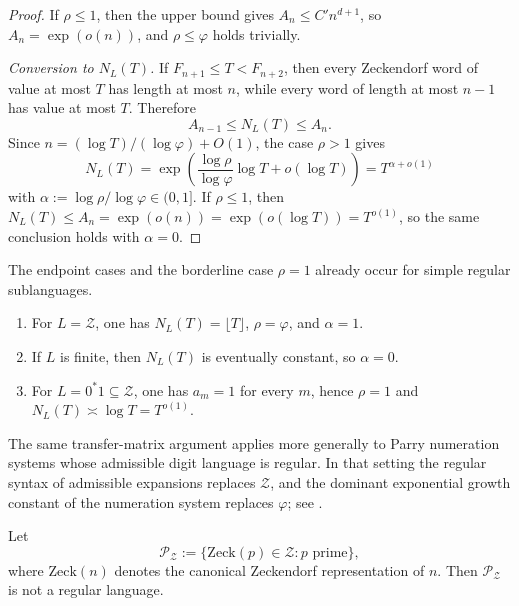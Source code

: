 \begin{proof}
  If \(\rho\le 1\), then the upper bound gives
  \(A_n\le C'n^{d+1}\), so \(A_n=\exp(o(n))\), and \(\rho\le\varphi\)
  holds trivially.

  \textit{Conversion to \(N_L(T)\).}
  If \(F_{n+1}\le T<F_{n+2}\), then every Zeckendorf word of value at
  most \(T\) has length at most \(n\), while every word of length at
  most \(n-1\) has value at most \(T\). Therefore
  \[
    A_{n-1}\le N_L(T)\le A_n.
  \]
  Since \(n=(\log T)/(\log\varphi)+O(1)\), the case \(\rho>1\) gives
  \[
    N_L(T)
    =\exp\!\left(
      \frac{\log\rho}{\log\varphi}\log T+o(\log T)
    \right)
    =T^{\alpha+o(1)}
  \]
  with \(\alpha:=\log\rho/\log\varphi\in(0,1]\). If \(\rho\le 1\),
  then \(N_L(T)\le A_n=\exp(o(n))=\exp(o(\log T))=T^{o(1)}\), so the
  same conclusion holds with \(\alpha=0\).
\end{proof}

\begin{remark}\label{rem:zeckendorf-examples}
  The endpoint cases and the borderline case \(\rho=1\) already occur
  for simple regular sublanguages.
  \begin{enumerate}[label=\textup{(\roman*)}]
    \item For \(L=\mathcal Z\), one has \(N_L(T)=\lfloor T\rfloor\),
    \(\rho=\varphi\), and \(\alpha=1\).
    \item If \(L\) is finite, then \(N_L(T)\) is eventually constant,
    so \(\alpha=0\).
    \item For \(L=0^\ast1\subseteq\mathcal Z\), one has \(a_m=1\) for
    every \(m\), hence \(\rho=1\) and
    \(N_L(T)\asymp \log T=T^{o(1)}\).
  \end{enumerate}
\end{remark}

\begin{remark}
  The same transfer-matrix argument applies more generally to Parry
  numeration systems whose admissible digit language is regular. In that
  setting the regular syntax of admissible expansions replaces
  \(\mathcal Z\), and the dominant exponential growth constant of the
  numeration system replaces \(\varphi\); see
  \cite{Frougny1992,BruyereHansel1997}.
\end{remark}

\begin{corollary}
  \label{cor:zeckendorf-prime-language-not-regular}
  Let
  \[
    \mathcal P_{\mathcal Z}
    :=\{\mathrm{Zeck}(p)\in\mathcal Z:p\text{ prime}\},
  \]
  where \(\mathrm{Zeck}(n)\) denotes the canonical Zeckendorf
  representation of \(n\). Then \(\mathcal P_{\mathcal Z}\) is not a
  regular language.
\end{corollary}

